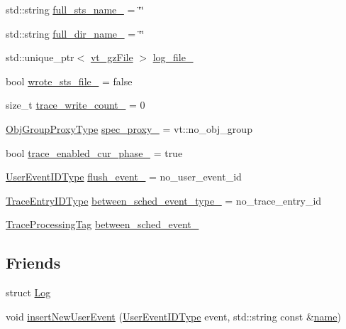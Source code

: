 \begin{DoxyCompactItemize}
\item 
std\+::string \hyperlink{structvt_1_1trace_1_1_trace_a5f89444a6ab438319c52d00bb6bce470}{full\+\_\+sts\+\_\+name\+\_\+} = \char`\"{}\char`\"{}
\item 
std\+::string \hyperlink{structvt_1_1trace_1_1_trace_a92e71504eb0b39de506ce157c1073443}{full\+\_\+dir\+\_\+name\+\_\+} = \char`\"{}\char`\"{}
\item 
std\+::unique\+\_\+ptr$<$ \hyperlink{structvt_1_1trace_1_1vt__gz_file}{vt\+\_\+gz\+File} $>$ \hyperlink{structvt_1_1trace_1_1_trace_a8bb3cd03753fc88c9c1b20990e254b4e}{log\+\_\+file\+\_\+}
\item 
bool \hyperlink{structvt_1_1trace_1_1_trace_a1ee7ce001d317ebb4b30dc04e5902ca4}{wrote\+\_\+sts\+\_\+file\+\_\+} = false
\item 
size\+\_\+t \hyperlink{structvt_1_1trace_1_1_trace_a3469fd513c3de85df68e56299e1e5247}{trace\+\_\+write\+\_\+count\+\_\+} = 0
\item 
\hyperlink{namespacevt_ad7cae989df485fccca57f0792a880a8e}{Obj\+Group\+Proxy\+Type} \hyperlink{structvt_1_1trace_1_1_trace_a15282e64860d2a553d39396c9c1fe784}{spec\+\_\+proxy\+\_\+} = vt\+::no\+\_\+obj\+\_\+group
\item 
bool \hyperlink{structvt_1_1trace_1_1_trace_aa24ff46d33eb7fead86a961725589320}{trace\+\_\+enabled\+\_\+cur\+\_\+phase\+\_\+} = true
\item 
\hyperlink{namespacevt_1_1trace_a5908920d051c144c89f17c69ed262350}{User\+Event\+I\+D\+Type} \hyperlink{structvt_1_1trace_1_1_trace_a20ab4375701a67ac8b2d01f95b64c395}{flush\+\_\+event\+\_\+} = no\+\_\+user\+\_\+event\+\_\+id
\item 
\hyperlink{namespacevt_1_1trace_a3c14050715ba9eceaeff51fb3de64f2f}{Trace\+Entry\+I\+D\+Type} \hyperlink{structvt_1_1trace_1_1_trace_a3be76c8f807837a4b242a5a28c005599}{between\+\_\+sched\+\_\+event\+\_\+type\+\_\+} = no\+\_\+trace\+\_\+entry\+\_\+id
\item 
\hyperlink{structvt_1_1trace_1_1_trace_processing_tag}{Trace\+Processing\+Tag} \hyperlink{structvt_1_1trace_1_1_trace_a3fdadda342771b037bb85aa77e0fc9cb}{between\+\_\+sched\+\_\+event\+\_\+}
\end{DoxyCompactItemize}
\subsection*{Friends}
\begin{DoxyCompactItemize}
\item 
struct \hyperlink{structvt_1_1trace_1_1_trace_add132ae9df1b7ef820c8082c32b0f839}{Log}
\item 
void \hyperlink{structvt_1_1trace_1_1_trace_a17caa1eeb27fd6a4af8786a7f0679d77}{insert\+New\+User\+Event} (\hyperlink{namespacevt_1_1trace_a5908920d051c144c89f17c69ed262350}{User\+Event\+I\+D\+Type} event, std\+::string const \&\hyperlink{structvt_1_1trace_1_1_trace_aaae4bbf6d009229a5c8b9db67a127942}{name})
\end{DoxyCompactItemize}
